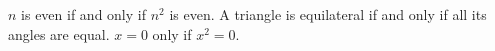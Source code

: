 $n$ is even if and only if $n^{2}$ is even.
A triangle is equilateral if and only if all its angles are equal.
$x = 0$ only if $x^{2} = 0$.